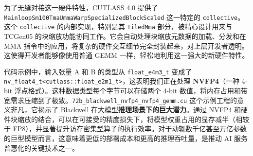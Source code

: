 为了无缝对接这一硬件特性，CUTLASS 4.0 提供了 \texttt{M\allowbreak{}a\allowbreak{}i\allowbreak{}n\allowbreak{}l\allowbreak{}o\allowbreak{}o\allowbreak{}p\allowbreak{}S\allowbreak{}m\allowbreak{}1\allowbreak{}0\allowbreak{}0\allowbreak{}T\allowbreak{}m\allowbreak{}a\allowbreak{}U\allowbreak{}m\allowbreak{}m\allowbreak{}a\allowbreak{}W\allowbreak{}a\allowbreak{}r\allowbreak{}p\allowbreak{}S\allowbreak{}p\allowbreak{}e\allowbreak{}c\allowbreak{}i\allowbreak{}a\allowbreak{}l\allowbreak{}i\allowbreak{}z\allowbreak{}e\allowbreak{}d\allowbreak{}B\allowbreak{}l\allowbreak{}o\allowbreak{}c\allowbreak{}k\allowbreak{}S\allowbreak{}c\allowbreak{}a\allowbreak{}l\allowbreak{}e\allowbreak{}d} 这一特定的 \texttt{collective}。这个 \texttt{collective} 的内部实现，特别是其 \texttt{Tiled\allowbreak{}Mma} 部分，被精心设计用来与 TCGen05 的块缩放功能协同工作。它会自动处理块缩放元数据的加载、分发和在 MMA 指令中的应用，将复杂的硬件交互细节完全封装起来，对上层开发者透明。这使得开发者能够像使用普通 GEMM 一样，轻松地利用这一强大的新硬件特性。

代码示例中，输入张量 A 和 B 的类型从 \texttt{float\_\allowbreak{}e4m3\_\allowbreak{}t} 变成了 \texttt{n\allowbreak{}v\allowbreak{}\_\allowbreak{}f\allowbreak{}l\allowbreak{}o\allowbreak{}a\allowbreak{}t\allowbreak{}4\allowbreak{}\_\allowbreak{}t\allowbreak{}<\allowbreak{}c\allowbreak{}u\allowbreak{}t\allowbreak{}l\allowbreak{}a\allowbreak{}s\allowbreak{}s\allowbreak{}:\allowbreak{}:\allowbreak{}f\allowbreak{}l\allowbreak{}o\allowbreak{}a\allowbreak{}t\allowbreak{}\_\allowbreak{}e\allowbreak{}2\allowbreak{}m\allowbreak{}1\allowbreak{}\_\allowbreak{}t\allowbreak{}>}，这表明我们正在处理 \textbf{NVFP4}（一种 4-bit 浮点格式）。这种数据类型每个字节可以存储两个 4-bit 数值，将内存占用和带宽需求压缩到了极致。\texttt{7\allowbreak{}2\allowbreak{}b\allowbreak{}\_\allowbreak{}b\allowbreak{}l\allowbreak{}a\allowbreak{}c\allowbreak{}k\allowbreak{}w\allowbreak{}e\allowbreak{}l\allowbreak{}l\allowbreak{}\_\allowbreak{}n\allowbreak{}v\allowbreak{}f\allowbreak{}p\allowbreak{}4\allowbreak{}\_\allowbreak{}n\allowbreak{}v\allowbreak{}f\allowbreak{}p\allowbreak{}4\allowbreak{}\_\allowbreak{}g\allowbreak{}e\allowbreak{}m\allowbreak{}m\allowbreak{}.\allowbreak{}c\allowbreak{}u} 这个示例工程的意义非凡，它揭示了 Blackwell 在大模型\textbf{推理场景下的巨大潜力}。通过 NVFP4 和硬件块缩放的结合，可以在可接受的精度损失下，将模型权重占用的显存减半（相较于 FP8），并显著提升访存密集型算子的执行效率。对于动辄数千亿甚至万亿参数的巨型模型而言，这意味着更低的部署成本和更高的推理吞吐量，是推动 AI 服务普惠化的关键技术之一。

